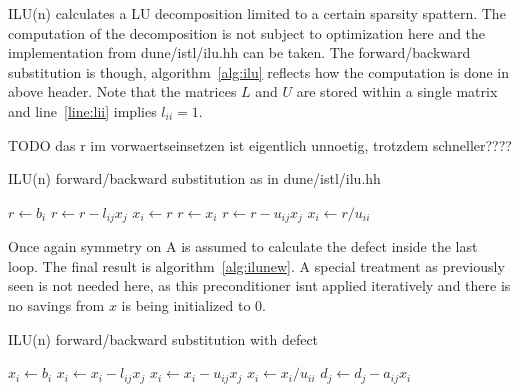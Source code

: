 \documentclass{article}
\begin{document}
ILU(n) calculates a LU decomposition limited to a certain sparsity spattern. The computation of the decomposition is not subject to optimization here and the implementation from dune/istl/ilu.hh can be taken. The forward/backward substitution is though, algorithm~\ref{alg:ilu} reflects how the computation is done in above header. Note that the matrices $L$ and $U$ are stored within a single matrix and line~\ref{line:lii} implies $l_{ii}=1$.

TODO das r im vorwaertseinsetzen ist eigentlich unnoetig, trotzdem schneller????

\begin{algorithm}
\caption{ILU(n) forward/backward substitution as in dune/istl/ilu.hh}
\label{alg:ilu}
\begin{algorithmic}
  \State $r\gets b_i$
    \State $r\gets r-l_{ij}x_j$
  \EndFor
  \State $x_i\gets r$ \label{line:lii}
\EndFor
{}
  \State $r\gets x_i$
    \State $r\gets r-u_{ij}x_j$
  \EndFor
  \State $x_i\gets r/u_{ii}$
\EndFor
\end{algorithmic}
\end{algorithm}

Once again symmetry on A is assumed to calculate the defect inside the last loop. The final result is algorithm~\ref{alg:ilunew}. A special treatment as previously seen is not needed here, as this preconditioner isnt applied iteratively and there is no savings from $x$ is being initialized to $0$.

\begin{algorithm}
\caption{ILU(n) forward/backward substitution with defect}
\label{alg:ilunew}
\begin{algorithmic}
  \State $x_i\gets b_i$
    \State $x_i\gets x_i-l_{ij}x_j$
  \EndFor
\EndFor
{}
    \State $x_i\gets x_i-u_{ij}x_j$
  \EndFor
  \State $x_i\gets x_i/u_{ii}$
    \State $d_j\gets d_j-a_{ij}x_i$
  \EndFor
\EndFor
\end{algorithmic}
\end{algorithm}
\end{document}
